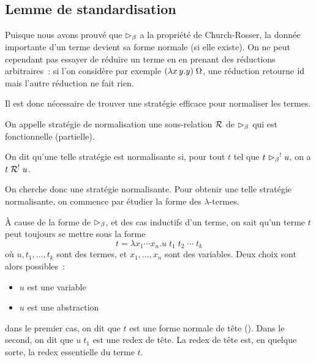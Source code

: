 \subsection{Lemme de standardisation}

Puisque nous avons prouvé que $\mathrel{\rhd_{\beta}}$ a la propriété de Church-Rosser, la donnée
importante d'un terme devient sa forme normale (si elle existe). On ne peut
cependant pas essayer de réduire un terme en en prenant des réductions
arbitraires~: si l'on considère par exemple $(\lambda x\,y.y)\;\Omega$,
une réduction retourne $\operatorname{id}$ mais l'autre réduction ne fait rien.

Il est donc nécessaire de trouver une stratégie efficace pour normaliser les
termes.

\begin{definition}
  On appelle stratégie de normalisation une sous-relation $\mathrel{\mathcal{R}}$ de $\mathrel{\rhd_{\beta}}$
  qui est fonctionnelle (partielle).

  On dit qu'une telle stratégie est normalisante si, pour tout $t$ tel que
  $t\mathrel{\rhd_{\beta}}^{\mathord{!}} u$, on a $t\mathrel{\mathcal{R}}^{\mathord{!}} u$.
\end{definition}

On cherche donc une stratégie normalisante. Pour obtenir une telle stratégie
normalisante, on commence par étudier la forme des $\lambda$-termes.

\`A cause de la forme de $\mathrel{\rhd_{\beta}}$, et des cas inductifs d'un terme, on sait qu'un
terme $t$ peut toujours se mettre sous la forme
\[t = \lambda x_1\cdots x_n.u\;t_1\;t_2\;\cdots\;t_k\]
où $u,t_1,\ldots,t_k$ sont des termes, et $x_1,\ldots,x_n$ sont des variables.
Deux choix sont alors possibles~:
\begin{itemize}
\item $u$ est une variable
\item $u$ est une abstraction
\end{itemize}
dans le premier cas, on dit que $t$ est une forme normale de tête
(). Dans le second, on dit que $u\;t_1$ est une
redex de tête. La redex de tête est, en quelque sorte, la redex essentielle du
terme $t$.

